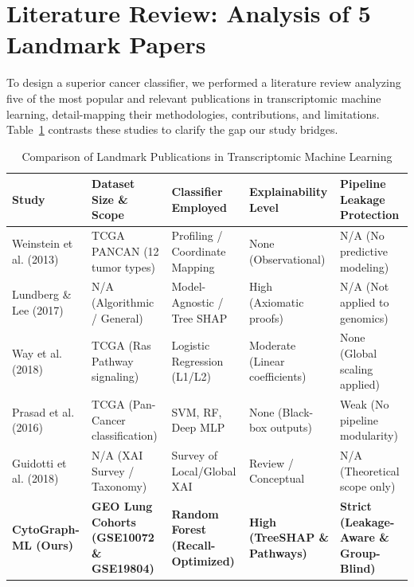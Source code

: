 \documentclass[journal,10pt]{IEEEtran}
\begin{document}
\section{Literature Review: Analysis of 5 Landmark Papers}
To design a superior cancer classifier, we performed a literature review analyzing five of the most popular and relevant publications in transcriptomic machine learning, detail-mapping their methodologies, contributions, and limitations. Table~\ref{tab:landmark_papers} contrasts these studies to clarify the gap our study bridges.

\begin{table}[htbp]
\centering
\caption{Comparison of Landmark Publications in Transcriptomic Machine Learning}
\label{tab:landmark_papers}
\begin{tabular}{lp{3.5cm}p{3cm}p{3cm}p{3.5cm}}
\toprule
\textbf{Study} & \textbf{Dataset Size \& Scope} & \textbf{Classifier Employed} & \textbf{Explainability Level} & \textbf{Pipeline Leakage Protection} \\
\midrule
Weinstein et al. (2013)~\cite{tcga} & TCGA PANCAN (12 tumor types) & Profiling / Coordinate Mapping & None (Observational) & N/A (No predictive modeling) \\
Lundberg \& Lee (2017)~\cite{shap} & N/A (Algorithmic / General) & Model-Agnostic / Tree SHAP & High (Axiomatic proofs) & N/A (Not applied to genomics) \\
Way et al. (2018)~\cite{way} & TCGA (Ras Pathway signaling) & Logistic Regression (L1/L2) & Moderate (Linear coefficients) & None (Global scaling applied) \\
Prasad et al. (2016)~\cite{prasad} & TCGA (Pan-Cancer classification) & SVM, RF, Deep MLP & None (Black-box outputs) & Weak (No pipeline modularity) \\
Guidotti et al. (2018)~\cite{guidotti} & N/A (XAI Survey / Taxonomy) & Survey of Local/Global XAI & Review / Conceptual & N/A (Theoretical scope only) \\
\midrule
\textbf{CytoGraph-ML (Ours)} & \textbf{GEO Lung Cohorts (GSE10072 \& GSE19804)} & \textbf{Random Forest (Recall-Optimized)} & \textbf{High (TreeSHAP \& Pathways)} & \textbf{Strict (Leakage-Aware \& Group-Blind)} \\
\bottomrule
\end{tabular}
\end{table}
\end{document}
